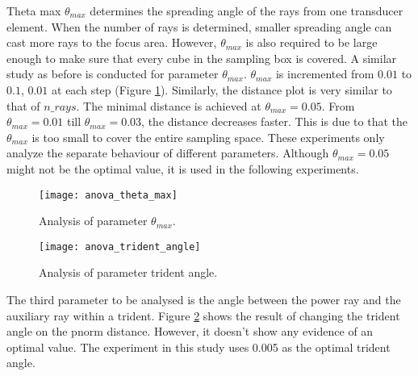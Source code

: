 Theta max $\theta_{max}$ determines the spreading angle of the rays from one transducer element. When the number of rays is determined, smaller spreading angle can cast more rays to the focus area. However, $\theta_{max}$ is also required to be large enough to make sure that every cube in the sampling box is covered. A similar study as before is conducted for parameter $\theta_{max}$. $\theta_{max}$ is incremented from $0.01$ to $0.1$, $0.01$ at each step (Figure \ref{fig:anova_theta_max}). Similarly, the distance plot is very similar to that of $n\_rays$. The minimal distance is achieved at $\theta_{max}=0.05$. From $\theta_{max}=0.01$ till $\theta_{max}=0.03$, the distance decreases faster. This is due to that the $\theta_{max}$ is too small to cover the entire sampling space. These experiments only analyze the separate behaviour of different parameters. Although $\theta_{max}=0.05$ might not be the optimal value, it is used in the following experiments.

\begin{figure}[h]
    \centering
    \texttt{[image: anova\_theta\_max]}
    \caption{Analysis of parameter $\theta_{max}$.}
    \label{fig:anova_theta_max}
\end{figure}

\begin{figure}[h]
    \centering
    \texttt{[image: anova\_trident\_angle]}
    \caption{Analysis of parameter trident angle.}
    \label{fig:anova_trident_angle}
\end{figure}

The third parameter to be analysed is the angle between the power ray and the auxiliary ray within a trident. Figure \ref{fig:anova_trident_angle} shows the result of changing the trident angle on the pnorm distance. However, it doesn't show any evidence of an optimal value. The experiment in this study uses 0.005 as the optimal trident angle.
